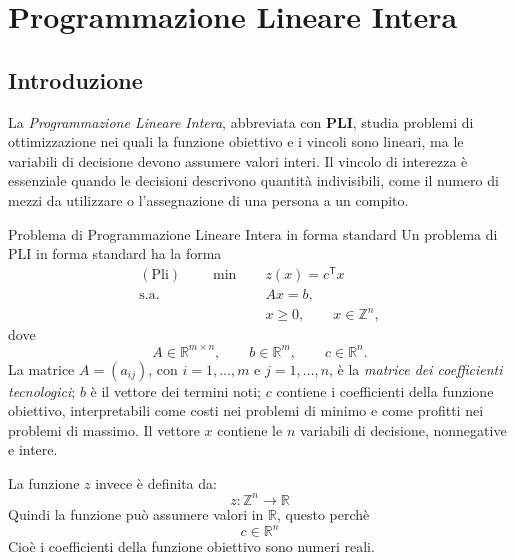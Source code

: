 \chapter{Programmazione Lineare Intera}
\label{chap:programmazione-lineare-intera}

\section{Introduzione}

La \emph{Programmazione Lineare Intera}, abbreviata con \textbf{PLI},
studia problemi di ottimizzazione nei quali la funzione obiettivo e i
vincoli sono lineari, ma le variabili di decisione devono assumere valori
interi. Il vincolo di interezza è essenziale quando le decisioni descrivono
quantità indivisibili, come il numero di mezzi da utilizzare o l'assegnazione
di una persona a un compito.

\begin{definition}{Problema di Programmazione Lineare Intera in forma standard}
Un problema di PLI in forma standard ha la forma
\begin{align*}
(\mathrm{Pli})\qquad \min \quad &z(x)=c^{\mathsf T}x\\
\text{s.a.}\quad &Ax=b,\\
&x\geq0,\qquad x\in\mathbb Z^n,
\end{align*}
dove
\[
A\in\mathbb R^{m\times n},\qquad b\in\mathbb R^m,\qquad c\in\mathbb R^n.
\]
La matrice \(A=(a_{ij})\), con \(i=1,\ldots,m\) e \(j=1,\ldots,n\),
è la \emph{matrice dei coefficienti tecnologici}; \(b\) è il vettore
dei termini noti; \(c\) contiene i coefficienti della funzione obiettivo,
interpretabili come costi nei problemi di minimo e come profitti
nei problemi di massimo. Il vettore \(x\) contiene le \(n\) variabili
di decisione, nonnegative e intere.

La funzione $z$ invece è definita da:
\[
z : \mathbb{Z}^n \to \mathbb{R}
\]
Quindi la funzione può assumere valori in $\mathbb{R}$, questo perchè 
\[
c\in\mathbb R^n
\]
Cioè i coefficienti della funzione obiettivo sono numeri reali.
\end{definition}

